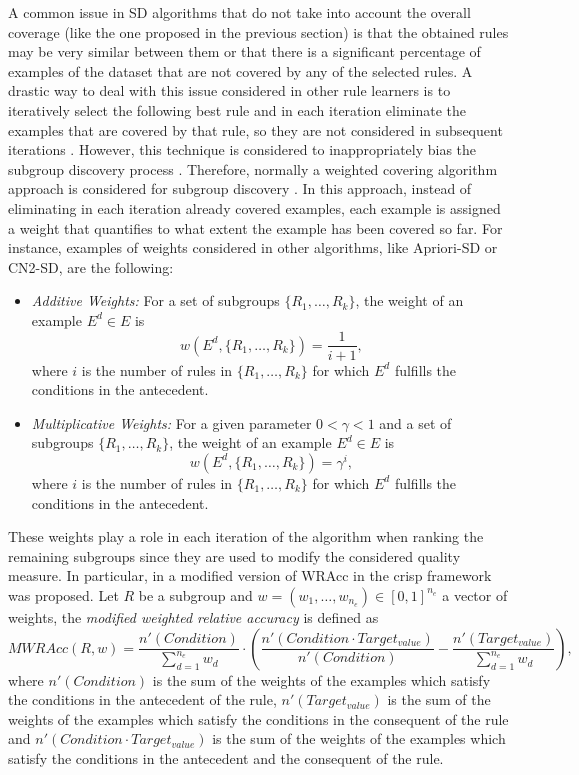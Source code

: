A common issue in SD algorithms that do not take into account the overall coverage (like the one proposed in the previous section) is that the obtained rules may be very similar between them or that there is a significant percentage of examples of the dataset that are not covered by any of the selected rules. A drastic way to deal with this issue considered in other rule learners is to iteratively select the following best rule and in each iteration eliminate the examples that are covered by that rule, so they are not considered in subsequent iterations \cite{Jovanoski2001}. However, this technique is considered to inappropriately bias the subgroup discovery process \cite{Lavrac2004}. Therefore, normally a weighted covering algorithm approach is considered for subgroup discovery \cite{Kavsek2003,Lavrac2004,Atzmueller2015}. In this approach, instead of eliminating in each iteration already covered examples, each example is assigned a weight that quantifies to what extent the example has been covered so far. For instance, examples of weights considered in other algorithms, like Apriori-SD or CN2-SD, are the following:
\begin{itemize}
	\item \textit{Additive Weights:} For a set of subgroups $\{R_1,\dots,R_k\}$, the weight of an example $E^d \in E$ is
	$$w(E^d,\{R_1,\dots,R_k\}) = \frac{1}{i+1},$$
	where $i$ is the number of rules in $\{R_1,\dots,R_k\}$ for which $E^d$ fulfills the conditions in the antecedent.
	\item \textit{Multiplicative Weights:} For a given parameter $0 < \gamma < 1$ and a set of subgroups $\{R_1,\dots,R_k\}$, the weight of an example $E^d \in E$ is
	$$w(E^d,\{R_1,\dots,R_k\}) = \gamma^i,$$
	where $i$ is the number of rules in $\{R_1,\dots,R_k\}$ for which $E^d$ fulfills the conditions in the antecedent.
\end{itemize}
These weights play a role in each iteration of the algorithm when ranking the remaining subgroups since they are used to modify the considered quality measure. In particular, in \cite{Kavsek2003,Lavrac2004} a modified version of WRAcc in the crisp framework was proposed. Let $R$ be a subgroup and $w=(w_1,\dots,w_{n_e}) \in [0,1]^{n_e}$ a vector of weights, the \textit{modified weighted relative accuracy} is defined as
$$
MWRAcc(R,w) = \frac{n'(Condition)}{\displaystyle \sum_{d=1}^{n_e}w_d} \cdot \left(\frac{n'(Condition \cdot Target_{value})}{n'(Condition)} - \frac{n'(Target_{value})}{\displaystyle \sum_{d=1}^{n_e}w_d} \right),
$$
where $n'(Condition)$ is the sum of the weights of the examples which satisfy the conditions in the antecedent of the rule,  $n'(Target_{value})$ is the sum of the weights of the examples which satisfy the conditions in the consequent of the rule and  $n'(Condition \cdot Target_{value})$ is the sum of the weights of the examples which satisfy the conditions in the antecedent and the consequent of the rule.

